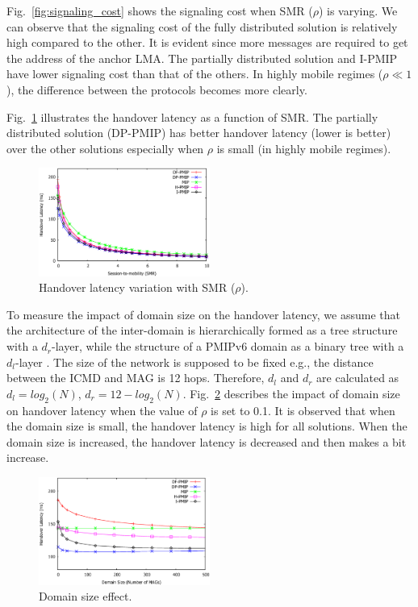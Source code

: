 Fig.~\ref{fig:signaling_cost} shows the signaling cost when SMR ($\rho$) is varying. We can observe that the signaling cost of the fully distributed solution is relatively high compared to the other. It is evident since more messages are required to get the address of the anchor LMA. The partially distributed solution and I-PMIP have lower signaling cost than that of the others. In highly mobile regimes ($\rho\ll1$), the difference between the protocols becomes more clearly. 

Fig.~\ref{fig:Handover_latency} illustrates the handover latency as a function of SMR. The partially distributed solution (DP-PMIP) has better handover latency (lower is better) over the other solutions especially when $\rho$ is small (in highly mobile regimes). 
\begin{figure}
\centering
\includegraphics[width=0.50\textwidth]{./Part3/Chapter7/figures/c9_handover_smr_6.eps}
\caption[Handover latency as a function of the session-to-mobility.]{Handover latency variation with SMR ($\rho$).}
\label{fig:Handover_latency}
\end{figure}

To measure the impact of domain size on the handover latency, we assume that the architecture of the inter-domain is hierarchically formed as a tree structure with a $d_{r}$-layer, while the structure of a PMIPv6 domain as a binary tree with a $d_{l}$-layer \cite{multicast_mobileIP}. The size of the network is supposed to be fixed e.g., the distance between the ICMD and MAG is 12 hops. Therefore, $d_{l}$ and $d_{r}$ are calculated as $d_{l}=log_{2}(N)$, $d_{r} = 12 - log_{2}(N)$. Fig.~\ref{fig:domain_size} describes the impact of domain size on handover latency when the value of $\rho$ is set to 0.1. It is observed that when the domain size is small, the handover latency is high for all solutions. When the domain size is increased, the handover latency is decreased and then makes a bit increase. 
\begin{figure}[h!]
\centering
\includegraphics[width=0.50\textwidth]{./Part3/Chapter7/figures/c9_domain_size_6.eps}
\setlength{\belowcaptionskip}{-10pt}
\caption[The impact of domain size on the handover latency.]{Domain size effect.}
\label{fig:domain_size}
\end{figure}

